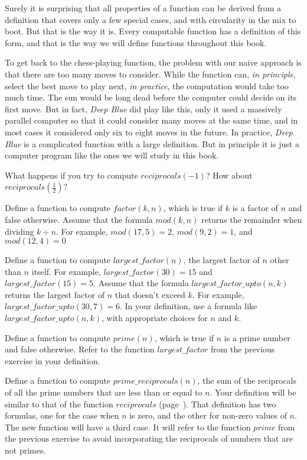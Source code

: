 Surely it is surprising that all properties of a function can be
derived from a definition that covers only a few special cases, and
with circularity in the mix to boot. But that is the way it is.
Every computable function has a definition of this form, and
that is the way we will define functions throughout this book.

To get back to the chess-playing function, the problem with our
naive approach is that there are
too many moves to consider.  While the function can, \emph{in principle},
select the best move to play next, \emph{in practice}, the computation
would take too much time. 
The sun would be long dead before the computer could decide on its first move.  
But in fact, \textit{Deep Blue}
did play like this, only it used a massively parallel computer so that
it could consider many moves at the same time, and in most cases it
considered only six to eight moves in the future.  
In practice, \textit{Deep Blue} is a complicated function 
with a large definition.  
But in principle it is just a computer program
like the ones we will study in this book.

\begin{ExerciseList}
\Exercise What happens if you try to compute $reciprocals(-1)$?  How
        about $reciprocals(\frac{1}{2})$?

\Exercise Define a function to compute $factor(k, n)$, which is true
        if $k$ is a factor of $n$ and false otherwise.
        Assume that the formula $mod(k,n)$ returns the remainder
        when dividing $k \div n$.
        For example, $mod(17,5)=2$, $mod(9,2)=1$, and $mod(12,4)=0$

\Exercise Define a function to compute $largest\_factor(n)$,
        the largest factor of $n$ other than $n$ itself.
        For example, $largest\_factor(30)=15$ and
        $largest\_factor(15)=5$.
        Assume that the formula
        $largest\_factor\_upto(n,k)$  returns the largest factor of
        $n$ that doesn't exceed $k$.
        For example, $largest\_factor\_upto(30,7)=6$.
        In your definition, use a formula like $largest\_factor\_upto(n,k)$, 
        with appropriate choices for $n$ and $k$.

\Exercise Define a function to compute $prime(n)$, which is true
        if $n$ is a prime number and false otherwise.
        Refer to the function $largest\_factor$
        from the previous exercise in your definition.

\Exercise Define a function to compute $prime\_reciprocals(n)$,
        the sum of the reciprocals of all the prime numbers that are less than or equal to $n$.
        Your definition will be similar to that of the function $reciprocals$ (page~\pageref{reciprocalsdef}).
        That definition has two formulas, one for the case when $n$ is zero,
        and the other for non-zero values of $n$. 
        The new function will have a third case. 
        It will refer to the function $prime$ from the previous exercise
        to avoid incorporating the reciprocals of numbers that are not primes.
\end{ExerciseList}

